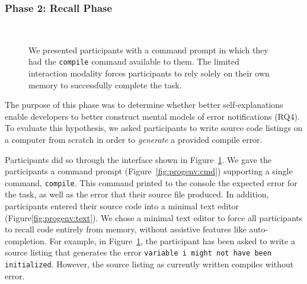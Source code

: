 \documentclass[conference]{IEEEtran}
\begin{document}
\subsubsection{Phase 2: Recall Phase}

\begin{figure}[!t]
  \centering  
  \\
  \caption{We presented participants with a command prompt in which they had the \texttt{compile} command available to them. The limited interaction modality forces participants to rely solely on their own memory to successfully complete the task.\label{fig:progenv}}
\end{figure}

The purpose of this phase was to determine whether better self-explanations enable developers to better construct mental models of error notifications (RQ4). To evaluate this hypothesis, we asked participants to write source code listings on a computer from scratch in order to \textit{generate} a provided compile error. 

Participants did so through the interface shown in Figure~\ref{fig:progenv}. We gave the participants a command prompt (Figure~\ref{fig:progenv:cmd}) supporting a single command, \texttt{compile}. This command printed to the console the expected error for the task, as well as the error that their source file produced. In addition, participants entered their source code into a minimal text editor (Figure\ref{fig:progenv:text}). We chose a minimal text editor to force all participants to recall code entirely from memory, without assistive features like auto-completion. For example, in Figure~\ref{fig:progenv}, the participant has been asked to write a source listing that generates the error \texttt{variable i might not have been initialized}. However, the source listing as currently written compiles without error.
\end{document}

